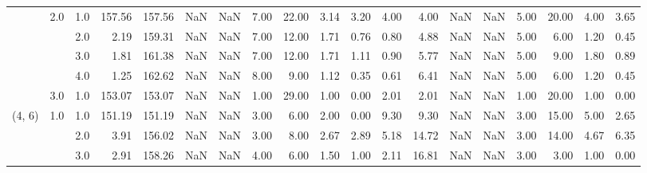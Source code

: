 \begin{tabular}{lllrrrrrrrrrrrrrrrr}
       & 2.0 & 1.0  &    157.56 &     157.56 &               NaN &                NaN &  7.00 &  22.00 &             3.14 &                         3.20 &      4.00 &       4.00 &               NaN &                NaN &  5.00 &  20.00 &             4.00 &                         3.65 \\
       &     & 2.0  &      2.19 &     159.31 &               NaN &                NaN &  7.00 &  12.00 &             1.71 &                         0.76 &      0.80 &       4.88 &               NaN &                NaN &  5.00 &   6.00 &             1.20 &                         0.45 \\
       &     & 3.0  &      1.81 &     161.38 &               NaN &                NaN &  7.00 &  12.00 &             1.71 &                         1.11 &      0.90 &       5.77 &               NaN &                NaN &  5.00 &   9.00 &             1.80 &                         0.89 \\
       &     & 4.0  &      1.25 &     162.62 &               NaN &                NaN &  8.00 &   9.00 &             1.12 &                         0.35 &      0.61 &       6.41 &               NaN &                NaN &  5.00 &   6.00 &             1.20 &                         0.45 \\
       & 3.0 & 1.0  &    153.07 &     153.07 &               NaN &                NaN &  1.00 &  29.00 &             1.00 &                         0.00 &      2.01 &       2.01 &               NaN &                NaN &  1.00 &  20.00 &             1.00 &                         0.00 \\
(4, 6) & 1.0 & 1.0  &    151.19 &     151.19 &               NaN &                NaN &  3.00 &   6.00 &             2.00 &                         0.00 &      9.30 &       9.30 &               NaN &                NaN &  3.00 &  15.00 &             5.00 &                         2.65 \\
       &     & 2.0  &      3.91 &     156.02 &               NaN &                NaN &  3.00 &   8.00 &             2.67 &                         2.89 &      5.18 &      14.72 &               NaN &                NaN &  3.00 &  14.00 &             4.67 &                         6.35 \\
       &     & 3.0  &      2.91 &     158.26 &               NaN &                NaN &  4.00 &   6.00 &             1.50 &                         1.00 &      2.11 &      16.81 &               NaN &                NaN &  3.00 &   3.00 &             1.00 &                         0.00 \\

\end{tabular}
